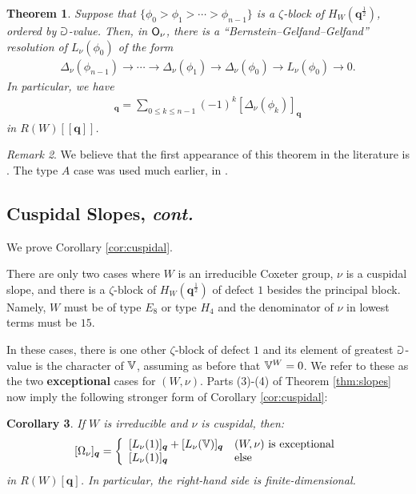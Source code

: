 \documentclass[a4paper,10pt,leqno]{amsart}
\theoremstyle{plain}
\theoremstyle{plain}
\newtheorem{thm}{Theorem}[subsection]
\theoremstyle{plain}
\newtheorem{cor}[thm]{Corollary}
\theoremstyle{definition}
\theoremstyle{remark}
\newtheorem{rem}[thm]{Remark}
\newcommand{\dfemph}[1]{\textbf{#1}}
\newcommand{\Q}{\bm{q}}
\newcommand{\slope}{\nu}
\begin{document}
\begin{thm}\label{thm:bgg}
Suppose that $\{\phi_0 > \phi_1 > \cdots > \phi_{n - 1}\}$ is a $\zeta$-block of $H_W(\Q^{\frac{1}{2}})$, ordered by $\mathbb{a}$-value.
Then, in $\sf{O}_\slope$, there is a ``Bernstein--Gelfand--Gelfand'' resolution of $L_\slope(\phi_0)$ of the form
\begin{align}
\Delta_\slope(\phi_{n - 1}) \to \cdots \to \Delta_\slope(\phi_1) \to \Delta_\slope(\phi_0) \to L_\slope(\phi_0) \to 0.
\end{align}
In particular, we have
\begin{align}
[L_\slope(\phi_0)]_{\Q} = \sum_{0 \leq k \leq n - 1} {(-1)^k} [\Delta_\slope(\phi_k)]_{\Q}
\end{align}
in $R(W)[\![\Q]\!]$.
\end{thm}

\begin{rem}
We believe that the first appearance of this theorem in the literature is \cite[Thm.\ 5.15]{rouquier_2008}.
The type $A$ case was used much earlier, in \cite{beg_imrn}.
\end{rem}

\subsection{Cuspidal Slopes, \emph{cont.}}

We prove Corollary \ref{cor:cuspidal}.

There are only two cases where $W$ is an irreducible Coxeter group, $\slope$ is a cuspidal slope, and there is a $\zeta$-block of $H_W(\Q^{\frac{1}{2}})$ of defect $1$ besides the principal block.
Namely, $W$ must be of type $E_8$ or type $H_4$ and the denominator of $\slope$ in lowest terms must be $15$. 

In these cases, there is one other $\zeta$-block of defect $1$ and its element of greatest $\mathbb{a}$-value is the character of $\mathbb{V}$, assuming as before that $\mathbb{V}^W = 0$.
We refer to these as the two \dfemph{exceptional} cases for $(W, \slope)$.
Parts (3)-(4) of Theorem \ref{thm:slopes} now imply the following stronger form of Corollary \ref{cor:cuspidal}:

\begin{cor}
If $W$ is irreducible and $\slope$ is cuspidal, then:
\begin{align}\label{eq:cuspidal}
[\Omega_\slope]_{\Q} 
= 
	\left\{\begin{array}{ll}
	{[L_\slope(1)]_{\Q} + [L_\slope(\bb{V})]_{\Q}}
		&\text{$(W, \slope)$ is exceptional}\\
	{[L_\slope(1)]_{\Q}}
		&\text{else}
	\end{array}\right.
\end{align}
in $R(W)[\Q]$.
In particular, the right-hand side is finite-dimensional.
\end{cor}
\end{document}
